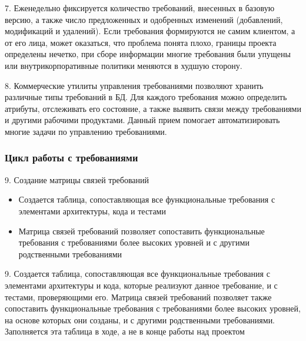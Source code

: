 \documentclass{../industrial-development}
\begin{document}
\lecturenotes

7. Еженедельно фиксируется количество требований, внесенных в базовую версию, а также число предложенных и одобренных изменений (добавлений, модификаций и удалений). Если требования формируются не самим клиентом, а от его лица, может оказаться, что проблема понята плохо, границы проекта определены нечетко, при сборе информации многие требования были упущены или внутрикорпоративные политики меняются в худшую сторону.

8. Коммерческие утилиты управления требованиями позволяют хранить различные типы требований в БД. Для каждого требования можно определить атрибуты, отслеживать его состояние, а также выявить связи между требованиями и другими рабочими продуктами. Данный прием помогает автоматизировать многие задачи по управлению требованиями.



\begin{frame} \frametitle{Цикл работы с требованиями}
	9. Создание матрицы связей требований
	\begin{itemize}
\item Создается таблица, сопоставляющая все функциональные требования с элементами архитектуры, кода и тестами
\item Матрица связей требований позволяет сопоставить функциональные требования с требованиями более высоких уровней и с другими родственными требованиями
	\end{itemize}
\end{frame}

\lecturenotes

9. Создается таблица, сопоставляющая все функциональные требования с элементами архитектуры и кода, которые реализуют данное требование, и с тестами, проверяющими его. Матрица связей требований позволяет также сопоставить функциональные требования с требованиями более высоких уровней, на основе которых они созданы, и с другими родственными требованиями. Заполняется эта таблица в ходе, а не в конце работы над проектом
\end{document}
